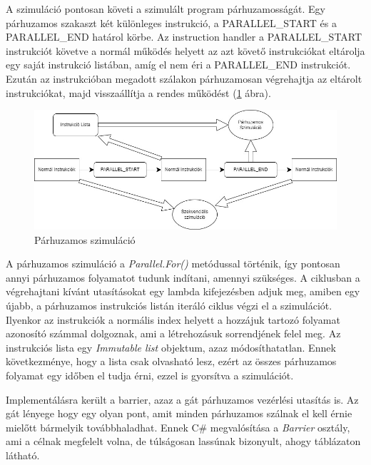 A szimuláció pontosan követi a szimulált program párhuzamosságát. Egy párhuzamos szakaszt két különleges instrukció, a PARALLEL{\_}START és a PARALLEL{\_}END határol körbe. Az instruction handler a PARALLEL{\_}START instrukciót követve a normál működés helyett az azt követő instrukciókat eltárolja egy saját instrukció listában, amíg el nem éri a PARALLEL{\_}END instrukciót. Ezután az instrukcióban megadott szálakon párhuzamosan végrehajtja az eltárolt instrukciókat, majd visszaállítja a rendes működést (\ref{fig:parallelSim} ábra).


\begin{figure}[h]
\centering
\includegraphics[scale=0.5]{images/Parallel_Simulation.jpg}
\caption{Párhuzamos szimuláció}
\label{fig:parallelSim}
\end{figure}


A párhuzamos szimuláció a \textit{Parallel.For()} \cite{pfor} metódussal történik, így pontosan annyi párhuzamos folyamatot tudunk indítani, amennyi szükséges. A ciklusban a végrehajtani kívánt utasításokat egy lambda kifejezésben adjuk meg, amiben egy újabb, a párhuzamos instrukciós listán iteráló ciklus végzi el a szimulációt. Ilyenkor az instrukciók a normális index helyett a hozzájuk tartozó folyamat azonosító számmal dolgoznak, ami a létrehozásuk sorrendjének felel meg. Az instrukciós lista egy \textit{Immutable list} objektum, azaz módosíthatatlan. Ennek következménye, hogy a lista csak olvasható lesz, ezért az összes párhuzamos folyamat egy időben el tudja érni, ezzel is gyorsítva a szimulációt.

Implementálásra került a barrier, azaz a gát párhuzamos vezérlési utasítás is. Az gát lényege hogy egy olyan pont, amit minden párhuzamos szálnak el kell érnie mielőtt bármelyik továbbhaladhat. Ennek C\# megvalósítása a \textit{Barrier} osztály, ami a célnak megfelelt volna, de túlságosan lassúnak bizonyult, ahogy  táblázaton látható.



